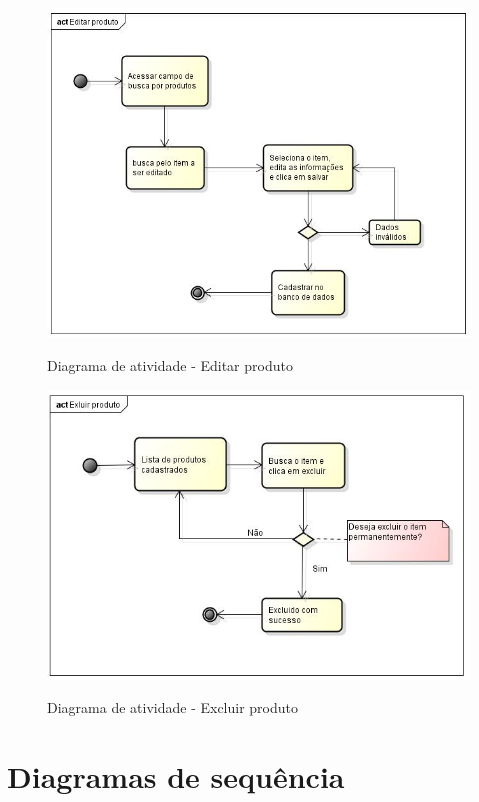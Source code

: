 \begin{anexosenv}
\begin{figure}[h]
\centering
\caption{Diagrama de atividade - Editar produto}
\includegraphics[width=12cm]{imagens/diagramas/atEditar}
\label{fig:Diagrama de sequência - Editar}
\end{figure}

\begin{figure}[H]
\centering
\caption{Diagrama de atividade - Excluir produto}
\includegraphics[width=12cm]{imagens/diagramas/atExcluir}
\label{fig:Diagrama de sequência - Excluir}
\end{figure}



	
\chapter{Diagramas de sequência}


\end{anexosenv}
